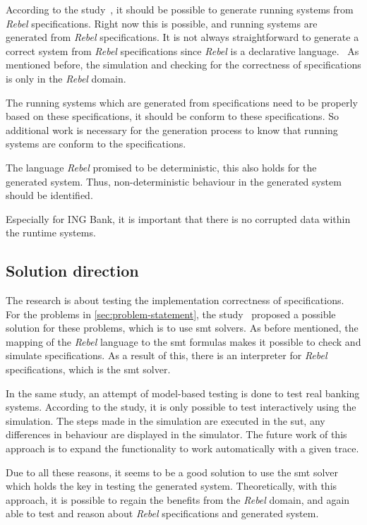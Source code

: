 According to the study~\cite[p.~3]{stoel2015case}, it should be possible to generate
running systems from \textit{Rebel} specifications. Right now this is possible, and
running systems are generated from \textit{Rebel} specifications. It is not always straightforward to generate a correct system from \textit{Rebel}
specifications since \textit{Rebel} is a declarative language.~\cite[p.~3]{stoel2015case}
As mentioned before, the simulation and checking for the correctness of
specifications is only in the \textit{Rebel} domain.

The running systems which are
generated from specifications need to be properly based on these specifications,
it should be conform to these specifications. So additional work is necessary for
the generation process to know that running systems are conform to the
specifications.

The language \textit{Rebel} promised to be deterministic, this also holds
for the generated system. Thus, non-deterministic behaviour in the generated
system should be identified.

Especially for ING Bank, it is important that there is no corrupted data within
the runtime systems.


\subsection{Solution direction}\label{sec:solution-direction}

The research is about testing the implementation correctness of specifications.
For the problems in \autoref{sec:problem-statement}, the
study~\cite[p.3]{stoel2015case} proposed a possible solution for these problems,
which is to use \gls{smt} solvers. As before mentioned, the mapping of the \textit{Rebel}
language to the \gls{smt} formulas makes it possible to check and simulate
specifications. As a result of this, there is an interpreter for \textit{Rebel}
specifications, which is the \gls{smt}
solver.~\cite[p.5]{stoel_storm_vinju_bosman_2016}

In the same study,
an attempt of model-based testing is done to test real banking systems.
According to the study, it is only possible to test interactively using the
simulation. The steps made in the simulation are executed in the \gls{sut}, any
differences in behaviour are displayed in the simulator. The future work of this
approach is to expand the functionality to work automatically with a given
trace.

Due to all these reasons, it seems to be a good solution to use the \gls{smt}
solver which holds the key in testing the generated system. Theoretically, with
this approach, it is possible to regain the benefits from the \textit{Rebel} domain, and
again able to test and reason about \textit{Rebel} specifications and generated system.

